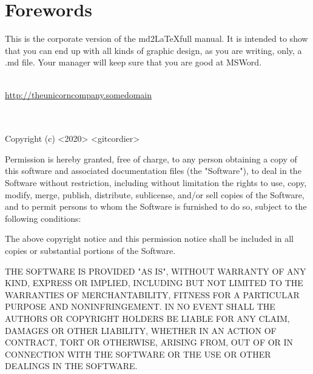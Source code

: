 \section*{Forewords}
This is the corporate version of the md2\LaTeX full manual.
It is intended to show that you can end up with all kinds of graphic design, 
as you are writing, only, a .md file. 
Your manager will keep sure that you are good at MSWord.


\vspace{7cm}
{\color{corporate_blue}{THE UNICORN COMPANY}}\\
\href{https://github.com/gitcordier}{\underline{http://theunicorncompany.somedomain}}\\
\href{mailto:admin@gcordier.eu}{}\\
\\
{\fw Copyright (c) <2020> <gitcordier>

Permission is hereby granted, free of charge, to any person obtaining a copy
of this software and associated documentation files (the "Software"), to deal
in the Software without restriction, including without limitation the rights
to use, copy, modify, merge, publish, distribute, sublicense, and/or sell
copies of the Software, and to permit persons to whom the Software is
furnished to do so, subject to the following conditions:

The above copyright notice and this permission notice shall be included in all
copies or substantial portions of the Software.

THE SOFTWARE IS PROVIDED "AS IS", WITHOUT WARRANTY OF ANY KIND, EXPRESS OR
IMPLIED, INCLUDING BUT NOT LIMITED TO THE WARRANTIES OF MERCHANTABILITY,
FITNESS FOR A PARTICULAR PURPOSE AND NONINFRINGEMENT. IN NO EVENT SHALL THE
AUTHORS OR COPYRIGHT HOLDERS BE LIABLE FOR ANY CLAIM, DAMAGES OR OTHER
LIABILITY, WHETHER IN AN ACTION OF CONTRACT, TORT OR OTHERWISE, ARISING FROM,
OUT OF OR IN CONNECTION WITH THE SOFTWARE OR THE USE OR OTHER DEALINGS IN THE
SOFTWARE.}
